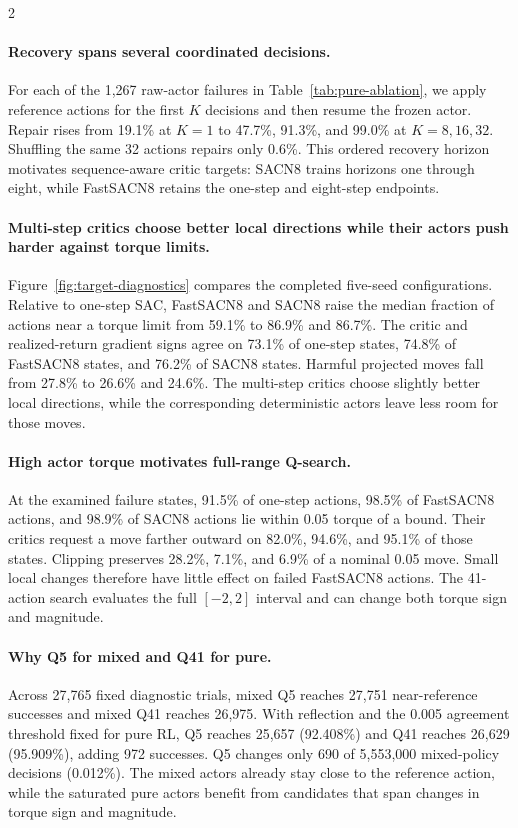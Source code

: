 \begin{multicols}{2}
\small
\paragraph{Recovery spans several coordinated decisions.}
For each of the 1,267 raw-actor failures in Table~\ref{tab:pure-ablation}, we apply reference actions for the first $K$ decisions and then resume the frozen actor. Repair rises from 19.1\% at $K=1$ to 47.7\%, 91.3\%, and 99.0\% at $K=8,16,32$. Shuffling the same 32 actions repairs only 0.6\%. This ordered recovery horizon motivates sequence-aware critic targets: SACN8 trains horizons one through eight, while FastSACN8 retains the one-step and eight-step endpoints.

\paragraph{Multi-step critics choose better local directions while their actors push harder against torque limits.}
Figure~\ref{fig:target-diagnostics} compares the completed five-seed configurations. Relative to one-step SAC, FastSACN8 and SACN8 raise the median fraction of actions near a torque limit from 59.1\% to 86.9\% and 86.7\%. The critic and realized-return gradient signs agree on 73.1\% of one-step states, 74.8\% of FastSACN8 states, and 76.2\% of SACN8 states. Harmful projected moves fall from 27.8\% to 26.6\% and 24.6\%. The multi-step critics choose slightly better local directions, while the corresponding deterministic actors leave less room for those moves.

\paragraph{High actor torque motivates full-range Q-search.}
At the examined failure states, 91.5\% of one-step actions, 98.5\% of FastSACN8 actions, and 98.9\% of SACN8 actions lie within 0.05 torque of a bound. Their critics request a move farther outward on 82.0\%, 94.6\%, and 95.1\% of those states. Clipping preserves 28.2\%, 7.1\%, and 6.9\% of a nominal 0.05 move. Small local changes therefore have little effect on failed FastSACN8 actions. The 41-action search evaluates the full $[-2,2]$ interval and can change both torque sign and magnitude.

\paragraph{Why Q5 for mixed and Q41 for pure.}
Across 27,765 fixed diagnostic trials, mixed Q5 reaches 27,751 near-reference successes and mixed Q41 reaches 26,975. With reflection and the 0.005 agreement threshold fixed for pure RL, Q5 reaches 25,657 (92.408\%) and Q41 reaches 26,629 (95.909\%), adding 972 successes. Q5 changes only 690 of 5,553,000 mixed-policy decisions (0.012\%). The mixed actors already stay close to the reference action, while the saturated pure actors benefit from candidates that span changes in torque sign and magnitude.


\end{multicols}
